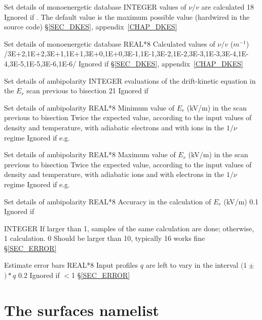 {Set details of monoenergetic database}
{INTEGER}
{ values of $\nu/v$ are calculated}
{18}
{Ignored if \notf{}. The default value is the maximum possible value (hardwired in the source code)}
{\S\ref{SEC_DKES}, appendix~\ref{CHAP_DKES}}

{Set details of monoenergetic database}
{REAL*8}
{Calculated values of $\nu/v$ ($m^{-1}$)}
{/3E+2,1E+2,3E+1,1E+1,3E+0,1E+0,3E-1,1E-1,3E-2,1E-2,3E-3,1E-3,3E-4,1E-4,3E-5,1E-5,3E-6,1E-6/}
{Ignored if \notf{}}
{\S\ref{SEC_DKES}, appendix~\ref{CHAP_DKES}}

{Set details of ambipolarity}
{INTEGER}
{ evaluations of the drift-kinetic equation in the $E_r$ scan previous to bisection}
{21}
{Ignored if \notf{}}
{}%

{Set details of ambipolarity}
{REAL*8}
{Minimum value of $E_r$ (kV/m) in the scan previous to bisection}
{Twice the expected value, according to the input values of density and temperature, with adiabatic electrons and with ions in the $1/\nu$ regime}
{Ignored if \notf{}}
{e.g. \citep{maassberg1999densitycontrol}}

{Set details of ambipolarity}
{REAL*8}
{Maximum value of $E_r$ (kV/m) in the scan previous to bisection}
{Twice the expected value, according to the input values of density and temperature,  with adiabatic ions and with electrons in the $1/\nu$ regime}
{Ignored if \notf{}}
{e.g. \citep{maassberg1999densitycontrol}}

{Set details of ambipolarity}
{REAL*8}
{Accuracy in the calculation of $E_r$ (kV/m)}
{0.1}
{Ignored if \notf{}}
{}%

{}
{INTEGER}
{If larger than 1,  samples of the same calculation are done; otherwise, 1 calculation.}
{0}
{Should be larger than 10, typically 16 works fine}
{\S\ref{SEC_ERROR}}

{Estimate error bars}
{REAL*8}
{Input profiles $q$ are left to vary in the interval $(1\pm $$)*q$}
{0.2}
{Ignored if $<$1}
{\S\ref{SEC_ERROR}}




\section{The {\ttfamily surfaces} namelist}\label{SEC_SURF}

